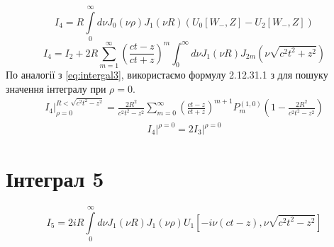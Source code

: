 \begin{equation}
I_4 = R \int \limits_{0}^{\infty} d \nu J_0(\nu \rho) J_1(\nu R) 
(U_0[ W_-, Z ] - U_2[ W_-, Z ])
\end{equation}
%
\begin{equation} \label{eq:i4_pol_int}
I_4 = I_2 + 2 R \sum_{m=1}^{\infty} \left( \frac{ct - z}{ct + z} \right)^m 
\int_{0}^{\infty} d \nu J_1(\nu R) J_{2m} (\nu \sqrt{c^2t^2 + z^2})
\end{equation}
%
По аналогії з \eqref{eq:intergal3}, використаємо формулу 2.12.31.1 з 
\cite[ст. 209]{imp:SpecFunc1983} для пошуку значення інтегралу при $ \rho = 0 $.
%
\begin{equation*} \begin{aligned}
\left. I_4 \right|_{\rho = 0}^{R < \sqrt{c^2 t^2 - z^2}} = 
\frac{2 R^2}{c^2 t^2 - z^2} \sum_{m=0}^{\infty} 
\left( \frac{ct - z}{ct + z} \right)^{m+1} P_{m}^{(1,0)} 
\left( 1 - \frac{2R^2}{c^2 t^2 - z^2} \right)
\end{aligned} \end{equation*}
%
\begin{equation} \begin{aligned} \label{eq:i4onaxis}
\left. I_4 \right|^{\rho = 0} = 2 \left. I_3 \right|^{\rho = 0}
\end{aligned} \end{equation}

\section{Інтеграл 5}

\begin{equation}
I_5 = 2 i R \int \limits_{0}^{\infty} d \nu 
J_1 \left( \nu R \right) J_1 \left( \nu \rho \right)
U_1 \left[ - i \nu \left( ct - z \right), \nu \sqrt{c^2t^2 - z^2} \right]
\end{equation}


